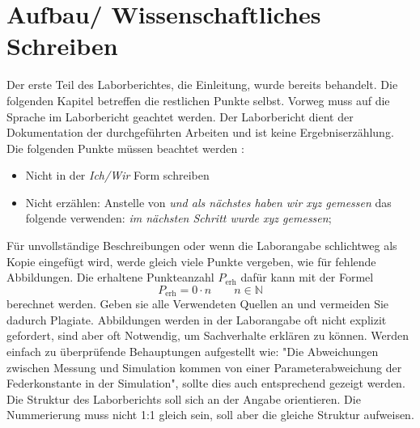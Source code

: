 \section{Aufbau/ Wissenschaftliches Schreiben}\label{sec:wissensch_schreiben}
Der erste Teil des Laborberichtes, die Einleitung, wurde bereits behandelt. Die folgenden Kapitel betreffen die restlichen Punkte selbst. Vorweg muss auf die Sprache im Laborbericht geachtet werden. Der Laborbericht dient der Dokumentation der durchgeführten Arbeiten und ist keine Ergebniserzählung. Die folgenden Punkte müssen beachtet werden \citep{Heesen.2014}:
\begin{itemize}
	\item Nicht in der \textit{Ich/Wir} Form schreiben
	\item Nicht erzählen: Anstelle von \textit{und als nächstes haben wir xyz gemessen} das folgende verwenden: \textit{im nächsten Schritt wurde xyz gemessen};
\end{itemize}
Für unvollständige Beschreibungen oder wenn die Laborangabe schlichtweg als Kopie eingefügt wird, werde gleich viele Punkte vergeben, wie für fehlende Abbildungen. Die erhaltene Punkteanzahl $P_{\text{erh}}$ dafür kann mit der Formel
\begin{equation}\label{eq:Punktezahl_fehlende_beschr}
	P_{\text{erh}} = 0 \cdot  n \qquad n \in \mathbb{N}
\end{equation}
berechnet werden. Geben sie alle Verwendeten Quellen an \citep{Umit_plag, Rettig.2017} und vermeiden Sie dadurch Plagiate. Abbildungen werden in der Laborangabe oft nicht explizit gefordert, sind aber oft Notwendig, um Sachverhalte erklären zu können. Werden einfach zu überprüfende Behauptungen aufgestellt wie: "Die Abweichungen zwischen Messung und Simulation kommen von einer Parameterabweichung der Federkonstante in der Simulation", sollte dies auch entsprechend gezeigt werden. Die Struktur des Laborberichts soll sich an der Angabe orientieren. Die Nummerierung muss nicht 1:1 gleich sein, soll aber die gleiche Struktur aufweisen. 



